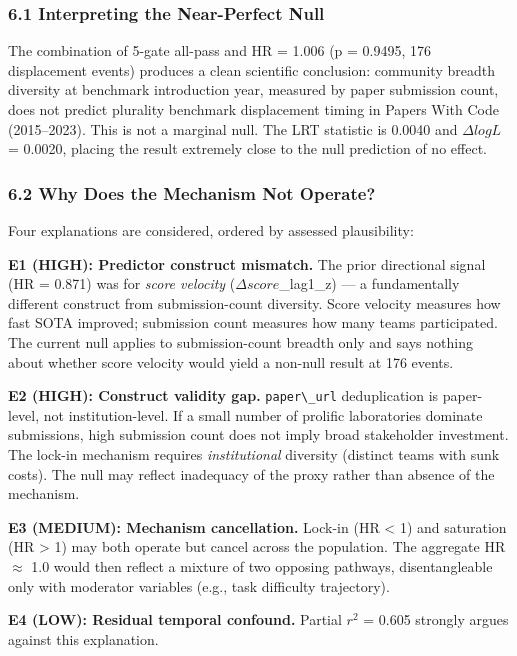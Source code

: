 
\subsubsection{6.1 Interpreting the Near-Perfect Null}

The combination of 5-gate all-pass and HR = 1.006 (p = 0.9495, 176 displacement events) produces a clean scientific conclusion: community breadth diversity at benchmark introduction year, measured by paper submission count, does not predict plurality benchmark displacement timing in Papers With Code (2015--2023). This is not a marginal null. The LRT statistic is 0.0040 and $\Delta logL$ = 0.0020, placing the result extremely close to the null prediction of no effect.

\subsubsection{6.2 Why Does the Mechanism Not Operate?}

Four explanations are considered, ordered by assessed plausibility:

\textbf{E1 (HIGH): Predictor construct mismatch.} The prior directional signal (HR = 0.871) was for \textit{score velocity} ($\Delta score$\_lag1\_z) --- a fundamentally different construct from submission-count diversity. Score velocity measures how fast SOTA improved; submission count measures how many teams participated. The current null applies to submission-count breadth only and says nothing about whether score velocity would yield a non-null result at 176 events.

\textbf{E2 (HIGH): Construct validity gap.} \texttt{paper\textbackslash \_url} deduplication is paper-level, not institution-level. If a small number of prolific laboratories dominate submissions, high submission count does not imply broad stakeholder investment. The lock-in mechanism requires \textit{institutional} diversity (distinct teams with sunk costs). The null may reflect inadequacy of the proxy rather than absence of the mechanism.

\textbf{E3 (MEDIUM): Mechanism cancellation.} Lock-in (HR < 1) and saturation (HR > 1) may both operate but cancel across the population. The aggregate HR $\approx$ 1.0 would then reflect a mixture of two opposing pathways, disentangleable only with moderator variables (e.g., task difficulty trajectory).

\textbf{E4 (LOW): Residual temporal confound.} Partial $r^2$ = 0.605 strongly argues against this explanation.

